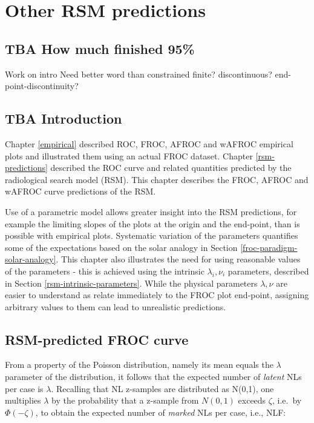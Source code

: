 \documentclass[
]{book}
\begin{document}
\hypertarget{rsm-other-predictions}{%
\chapter{Other RSM predictions}\label{rsm-other-predictions}}

\hypertarget{rsm-other-predictions-how-much-finished}{%
\section{TBA How much finished 95\%}\label{rsm-other-predictions-how-much-finished}}

Work on intro
Need better word than constrained
finite? discontinuous? end-point-discontinuity?

\hypertarget{rsm-other-predictions-intro}{%
\section{TBA Introduction}\label{rsm-other-predictions-intro}}

Chapter \ref{empirical} described ROC, FROC, AFROC and wAFROC empirical plots and illustrated them using an actual FROC dataset. Chapter \ref{rsm-predictions} described the ROC curve and related quantities predicted by the radiological search model (RSM). This chapter describes the FROC, AFROC and wAFROC curve predictions of the RSM.

Use of a parametric model allows greater insight into the RSM predictions, for example the limiting slopes of the plots at the origin and the end-point, than is possible with empirical plots. Systematic variation of the parameters quantifies some of the expectations based on the solar analogy in Section \ref{froc-paradigm-solar-analogy}. This chapter also illustrates the need for using reasonable values of the parameters - this is achieved using the intrinsic \(\lambda_i, \nu_i\) parameters, described in Section \ref{rsm-intrinsic-parameters}. While the physical parameters \(\lambda, \nu\) are easier to understand as relate immediately to the FROC plot end-point, assigning arbitrary values to them can lead to unrealistic predictions.

\hypertarget{rsm-other-predictions-froc-curve}{%
\section{RSM-predicted FROC curve}\label{rsm-other-predictions-froc-curve}}

From a property of the Poisson distribution, namely its mean equals the \(\lambda\) parameter of the distribution, it follows that the expected number of \emph{latent} NLs per case is \(\lambda\). Recalling that NL z-samples are distributed as N(0,1), one multiplies \(\lambda\) by the probability that a z-sample from \(N(0,1)\) exceeds \(\zeta\), i.e.~by \(\Phi(-\zeta)\), to obtain the expected number of \emph{marked} NLs per case, i.e., NLF:
\end{document}
